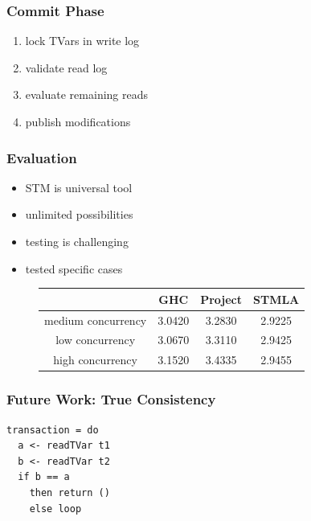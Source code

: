 \documentclass{beamer}
\begin{document}
  
  \begin{frame}
  \frametitle{Commit Phase}
  \begin{enumerate}\setlength\itemsep{1em}
   \item lock TVars in write log
   \item validate read log
   \item evaluate remaining reads
   \item publish modifications
  \end{enumerate}
  \end{frame}
  
  

  \begin{frame}
  \frametitle{Evaluation}
  \begin{itemize}\setlength\itemsep{1em}
   \item STM is universal tool
   \item unlimited possibilities
   \item testing is challenging
   \item tested specific cases
  \end{itemize}
  \end{frame}

   
\begin{frame}
\begin{figure}
\centering
 \begin{tabular}[center]{|c|c|c|c|}
  \hline
	                       & GHC    & Project & STMLA  \\ \hline
  medium concurrency  & 3.0420 &  3.2830 & 2.9225 \\ \hline
  low concurrency     & 3.0670 &  3.3110 & 2.9425 \\ \hline
  high concurrency    & 3.1520 &  3.4335 & 2.9455 \\ \hline
 \end{tabular}
\end{figure}
\end{frame}
  
  
 
\begin{frame}[fragile]
\frametitle{Future Work: True Consistency}
\begin{lstlisting}
transaction = do 
  a <- readTVar t1
  b <- readTVar t2
  if b == a 
    then return ()
    else loop
\end{lstlisting}
\end{frame} 
 
\end{document}
